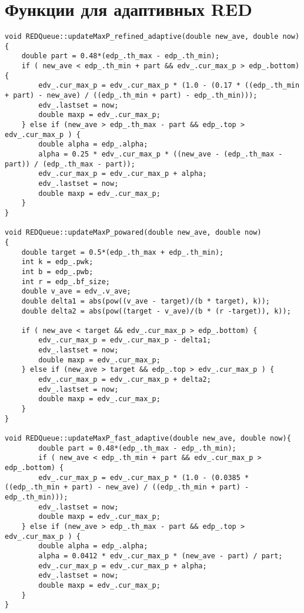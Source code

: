 \section{Функции для адаптивных RED}
\begin{verbatim}
void REDQueue::updateMaxP_refined_adaptive(double new_ave, double now)
{
  	double part = 0.48*(edp_.th_max - edp_.th_min);
 	if ( new_ave < edp_.th_min + part && edv_.cur_max_p > edp_.bottom) {
 		edv_.cur_max_p = edv_.cur_max_p * (1.0 - (0.17 * ((edp_.th_min + part) - new_ave) / ((edp_.th_min + part) - edp_.th_min))); 
 		edv_.lastset = now;
 		double maxp = edv_.cur_max_p;
 	} else if (new_ave > edp_.th_max - part && edp_.top > edv_.cur_max_p ) {
 		double alpha = edp_.alpha;
 		alpha = 0.25 * edv_.cur_max_p * ((new_ave - (edp_.th_max - part)) / (edp_.th_max - part));
 		edv_.cur_max_p = edv_.cur_max_p + alpha;
 		edv_.lastset = now;
 		double maxp = edv_.cur_max_p;
 	}
}

void REDQueue::updateMaxP_powared(double new_ave, double now)
{
  	double target = 0.5*(edp_.th_max + edp_.th_min);
  	int k = edp_.pwk;
  	int b = edp_.pwb;
  	int r = edp_.bf_size;
  	double v_ave = edv_.v_ave;
  	double delta1 = abs(pow((v_ave - target)/(b * target), k));
  	double delta2 = abs(pow((target - v_ave)/(b * (r -target)), k));
 	
 	if ( new_ave < target && edv_.cur_max_p > edp_.bottom) {
 		edv_.cur_max_p = edv_.cur_max_p - delta1; 
 		edv_.lastset = now;
 		double maxp = edv_.cur_max_p; 
 	} else if (new_ave > target && edp_.top > edv_.cur_max_p ) {
 		edv_.cur_max_p = edv_.cur_max_p + delta2;
 		edv_.lastset = now;
 		double maxp = edv_.cur_max_p;
 	}
}

void REDQueue::updateMaxP_fast_adaptive(double new_ave, double now){
	  	double part = 0.48*(edp_.th_max - edp_.th_min);
		if ( new_ave < edp_.th_min + part && edv_.cur_max_p > edp_.bottom) {
 		edv_.cur_max_p = edv_.cur_max_p * (1.0 - (0.0385 * ((edp_.th_min + part) - new_ave) / ((edp_.th_min + part) - edp_.th_min))); 
 		edv_.lastset = now;
 		double maxp = edv_.cur_max_p;
 	} else if (new_ave > edp_.th_max - part && edp_.top > edv_.cur_max_p ) {
 		double alpha = edp_.alpha;
 		alpha = 0.0412 * edv_.cur_max_p * (new_ave - part) / part;
 		edv_.cur_max_p = edv_.cur_max_p + alpha;
 		edv_.lastset = now;
 		double maxp = edv_.cur_max_p;
 	}
}
\end{verbatim}


